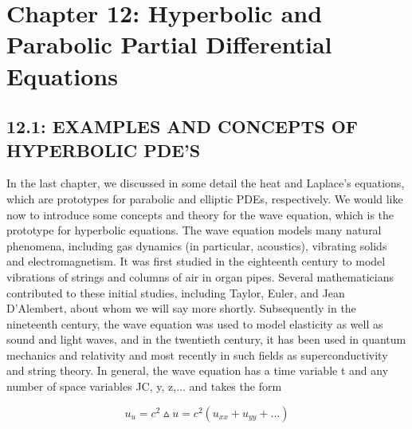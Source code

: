 \documentclass[../main.tex]{subfiles}
\begin{document}
\chapter*{Chapter 12: Hyperbolic and Parabolic Partial
Differential Equations}

\section*{12.1: EXAMPLES AND CONCEPTS OF HYPERBOLIC PDE'S}

In the last chapter, we discussed in some detail the heat and Laplace's equations,
which are prototypes for parabolic and elliptic PDEs, respectively. We would like
now to introduce some concepts and theory for the wave equation, which is the
prototype for hyperbolic equations. The wave equation models many natural
phenomena, including gas dynamics (in particular, acoustics), vibrating solids and
electromagnetism. It was first studied in the eighteenth century to model vibrations
of strings and columns of air in organ pipes. Several mathematicians contributed
to these initial studies, including Taylor, Euler, and Jean D'Alembert, about whom
we will say more shortly. Subsequently in the nineteenth century, the wave
equation was used to model elasticity as well as sound and light waves, and in the
twentieth century, it has been used in quantum mechanics and relativity and most
recently in such fields as superconductivity and string theory. In general, the
wave equation has a time variable t and any number of space variables JC, y, z,...
and takes the form

\begin{equation}
u_u=c^2 \vartriangle u=c^2(u_{xx}+u_{yy}+...) \label{eq:eps}
\end{equation}
\end{document}

